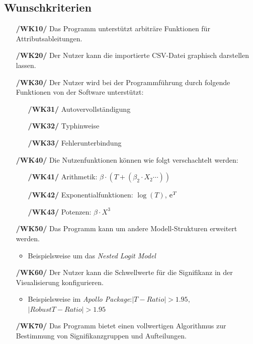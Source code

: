 \documentclass{article}
\begin{document}
\subsection{Wunschkriterien}
\begin{itemize}
    \item[\textbf{/WK10/}] Das Programm unterstützt arbiträre Funktionen für Attributsableitungen.
    \item[\textbf{/WK20/}] Der Nutzer kann die importierte CSV-Datei graphisch darstellen lassen.
    \item[\textbf{/WK30/}] Der Nutzer wird bei der Programmführung durch folgende Funktionen von der Software unterstützt:
    \begin{itemize}[leftmargin=.7in]
        \item[\textbf{/WK31/}] Autovervollständigung
        \item[\textbf{/WK32/}] Typhinweise
        \item[\textbf{/WK33/}] Fehlerunterbindung
    \end{itemize}
    \item[\textbf{/WK40/}] Die Nutzenfunktionen können wie folgt verschachtelt werden:
    \begin{itemize}[leftmargin=.7in]
        \item[\textbf{/WK41/}] Arithmetik: $\beta \cdot (T + (\beta_2 \cdot X_2 \cdots))$
        \item[\textbf{/WK42/}] Exponentialfunktionen: $\log(T)$, ${\rm e}^T$
        \item[\textbf{/WK43/}] Potenzen: $\beta \cdot X^3$
    \end{itemize}
    \item[\textbf{/WK50/}] Das Programm kann um andere Modell-Strukturen erweitert werden.
    \begin{itemize}
        \item Beispielsweise um das \textit{Nested Logit Model}
    \end{itemize}
    \item[\textbf{/WK60/}] Der Nutzer kann die Schwellwerte für die Signifikanz in der Visualisierung konfigurieren.
    \begin{itemize}
        \item Beispielsweise im \textit{Apollo Package}:\newline $|T-Ratio | > 1.95$, $|Robust T-Ratio | > 1.95$
    \end{itemize}    
    \item[\textbf{/WK70/}] Das Programm bietet einen vollwertigen Algorithmus zur Bestimmung von Signifikanzgruppen und Aufteilungen.
\end{itemize}
\end{document}
